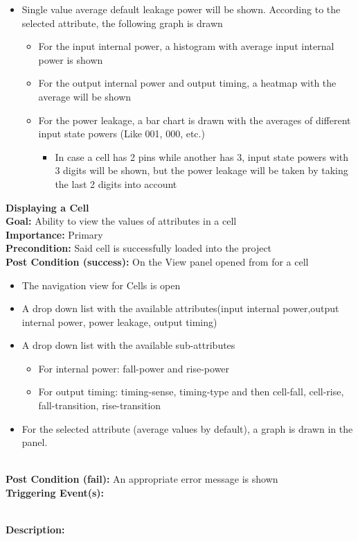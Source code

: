 \documentclass[10pt,a4paper]{report}
\newcommand{\precondition}[1]{
    \textbf{Precondition: } #1 \leavevmode \\
}
\newcommand{\FRDescription}[8]{
    \textbf{#1} \leavevmode \\
    \textbf{Goal: } #2 \leavevmode \\
    \textbf{Importance: } #3 \leavevmode \\
    \precondition{#4}
    \textbf{Post Condition (success): } #5 \leavevmode \\
    \textbf{Post Condition (fail): } #6 \leavevmode \\
    \textbf{Triggering Event(s): } #7 \leavevmode \\
    \textbf{Description: } \leavevmode \\ 
    #8}
\begin{document}
\begin{FR}
{\begin{itemize}
        \item Single value average default leakage power will be shown. According to the selected attribute, the following graph is drawn
        \begin{itemize}
            \item For the input internal power, a histogram with average input internal power is shown
            \item For the output internal power and output timing, a heatmap with the average will be shown
            \item For the power leakage, a bar chart is drawn with the averages of different input state powers (Like 001, 000, etc.)
                \begin{itemize}
                    \item In case a cell has 2 pins while another has 3, input state powers with 3 digits will be shown, but the power leakage will be taken by taking the last 2 digits into account
                \end{itemize}
        \end{itemize}
    \end{itemize}}
    \item \FRDescription{Displaying a Cell}
    {Ability to view the values of attributes in a cell}
    {Primary}
    {Said cell is successfully loaded into the project}
    {On the View panel opened from \label{FR-PREVIOUS} for a cell
    \begin{itemize}
        \item The navigation view for Cells is open
        \item A drop down list with the available attributes(input internal power,output internal power, power leakage, output timing)
        \item A drop down list with the available sub-attributes
        \begin{itemize}
            \item For internal power: fall-power and rise-power
            \item For output timing: timing-sense, timing-type and then cell-fall, cell-rise, fall-transition, rise-transition
        \end{itemize}
        \item For the selected attribute (average values by default), a graph is drawn in the panel.
    \end{itemize}}
    {An appropriate error message is shown}
    {\begin{itemize}

\end{itemize}}
\end{FR}
\end{document}
